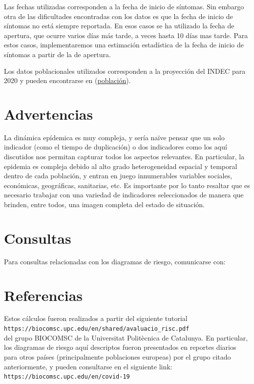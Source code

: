 \documentclass[12pt,a4paper]{article}
\begin{document}
Las fechas utilizadas corresponden a la fecha de inicio de síntomas. Sin embargo otra de las dificultades encontradas con los datos es que la fecha de inicio de síntomas no está siempre reportada. En esos casos se ha utilizado la fecha de apertura, que ocurre varios días más tarde, a veces hasta 10 días mas tarde. Para estos casos, implementaremos una estimación estadística de la fecha de inicio de síntomas a partir de la de apertura.

Los datos poblacionales utilizados corresponden a la proyección del INDEC para 2020 y pueden encontrarse en (\hyperref[https://sitioanterior.indec.gob.ar/nivel4_default.asp?id_tema_1=2&id_tema_2=24&id_tema_3=119]{población}).

\section*{Advertencias}
La dinámica epídemica es muy compleja, y sería na\"{i}ve pensar que un solo indicador 
(como el tiempo de duplicación) o dos indicadores como los aquí discutidos nos permitan capturar todos los aspectos relevantes. En particular, la epidemia es compleja debido al alto grado heterogeneidad espacial y temporal dentro de cada población, y entran en juego 
innumerables variables sociales, económicas, geográficas, sanitarias, etc.
Es importante por lo tanto resaltar que es necesario trabajar con una variedad de indicadores seleccionados de manera que brinden, entre todos, una imagen completa del estado de situación. 


\section*{Consultas}
Para consultas relacionadas con los diagramas de riesgo, comunicarse con:\\

\noindent{}

\section*{Referencias}
Estos cálculos fueron realizados a partir del siguiente 
tutorial\\

\verb|https://biocomsc.upc.edu/en/shared/avaluacio_risc.pdf|\\

del grupo BIOCOMSC de la Universitat Politècnica de Catalunya. 
En particular, los diagramas de riesgo aquí descriptos fueron presentados
en reportes diarios para otros países (principalmente poblaciones europeas) 
por el grupo citado anteriormente, y pueden consultarse en el siguiente link:\\

\verb|https://biocomsc.upc.edu/en/covid-19|
\end{document}
